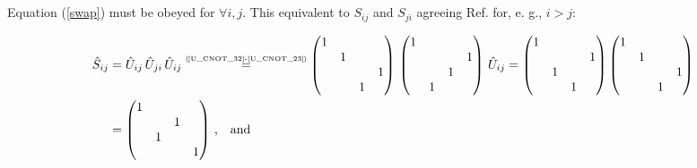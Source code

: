 \documentclass[11pt]{article}
\numberwithin{equation}{section} %
\numberwithin{figure}{section} %
\newcommand\numeq[1] %
  {\stackrel{\scriptscriptstyle(\mkern-1.5mu#1\mkern-1.5mu)}{=}}
\begin{document}
\begin{appendices}
\vspace{1cm}
\subsection{} \label{swap_proof}

Equation (\ref{swap}) must be obeyed for $\forall i,j$. This equivalent to $S_{ij}$ and $S_{ji}$ agreeing Ref. \cite[p.~xxxi, l.~2]{Nielsen} for, e. g., $i>j$:

\begin{equation} \label{swap_proof_eq}
\begin{split}
\hat{S}_{ij}
&	=\hat{U}_{ij}\,\hat{U}_{ji}\,\hat{U}_{ij} \numeq{\textrm{\ref{U_CNOT_32}-\ref{U_CNOT_23}}} \begin{pmatrix} 1&&&\\ &1&&\\ &&&1\\ &&1&\end{pmatrix}\, \begin{pmatrix}1&&&\\ &&&1\\ &&1&\\ &1&&\end{pmatrix}\,\hat{U}_{ij}= \begin{pmatrix} 1&&&\\ &&&1\\ &1&&\\ &&1&\end{pmatrix}\begin{pmatrix} 1&&&\\ &1&&\\ &&&1\\ &&1&\end{pmatrix}\\
&	= \begin{pmatrix} 1&&&\\ &&1&\\ &1&&\\ &&&1\end{pmatrix}\,\textrm{,}\quad \textrm{and} 
\end{split}
\end{equation}


\end{appendices}
\end{document}
